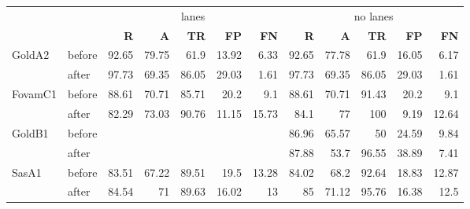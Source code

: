 
    \begin{tabular}{|l|l||r|r|r|r|r|r|r|r|r|r|}
\cmidrule{3-12}    \multicolumn{1}{r}{} & \multicolumn{1}{r|}{} & \multicolumn{5}{c|}{lanes}            & \multicolumn{5}{c|}{no lanes} \\
\cmidrule{3-12}    \multicolumn{1}{r}{} & \multicolumn{1}{r|}{} & \textbf{R} & \textbf{A} & \textbf{TR} & \textbf{FP} & \textbf{FN} & \textbf{R} & \textbf{A} & \textbf{TR} & \textbf{FP} & \textbf{FN} \\
\midrule
\midrule
    \multirow{2}[3]{*}{GoldA2} & before & 92.65 & 79.75 & 61.9  & 13.92 & 6.33  & 92.65 & 77.78 & 61.9  & 16.05 & 6.17 \\
\cmidrule{2-12}          & after & 97.73 & 69.35 & 86.05 & 29.03 & 1.61  & 97.73 & 69.35 & 86.05 & 29.03 & 1.61 \\
    \midrule
    \multirow{2}[4]{*}{FovamC1} & before & 88.61 & 70.71 & 85.71 & 20.2  & 9.1   & 88.61 & 70.71 & 91.43 & 20.2  & 9.1 \\
\cmidrule{2-12}          & after & 82.29 & 73.03 & 90.76 & 11.15 & 15.73 & 84.1  & 77    & 100   & 9.19  & 12.64 \\
    \midrule
    \multirow{2}[4]{*}{GoldB1} & before & \multicolumn{5}{c|}{\multirow{2}[4]{*}{}} & 86.96 & 65.57 & 50    & 24.59 & 9.84 \\
\cmidrule{2-2}\cmidrule{8-12}          & after & \multicolumn{5}{c|}{}                 & 87.88 & 53.7  & 96.55 & 38.89 & 7.41 \\
    \midrule
    \multirow{2}[4]{*}{SasA1} & before & 83.51 & 67.22 & 89.51 & 19.5  & 13.28 & 84.02 & 68.2  & 92.64 & 18.83 & 12.87 \\
\cmidrule{2-12}          & after & 84.54 & 71    & 89.63 & 16.02 & 13    & 85    & 71.12 & 95.76 & 16.38 & 12.5 \\
    \bottomrule
    \end{tabular}%

